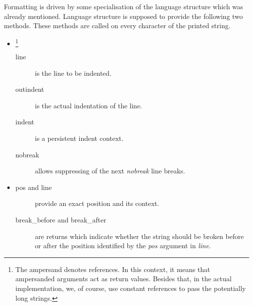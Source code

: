 Formatting is driven by some specialisation of the language structure which was already mentioned. Language structure is supposed to provide the following two methods. These methods are called on every character of the printed string.
\begin{itemize}
  \item {}\footnote{The ampersand denotes references. In this context, it means that ampersanded arguments act as return values. Besides that, in the actual implementation, we, of course, use constant references to pass the potentially long strings.}
	\begin{description}
	  \item[line] is the line to be indented. 
	  \item[outindent] is the actual indentation of the line.
	  \item[indent] is a persistent indent context.
	  \item[nobreak] allows suppressing of the next \emph{nobreak} line breaks.
	\end{description}
  \item {}
	\begin{description}
	  \item[pos and line] provide an exact position and its context.
	  \item[break\_before and break\_after] are returns which indicate whether the string should be broken before or after the position identified by the \emph{pos} argument in \emph{line}.
	\end{description}
\end{itemize}



